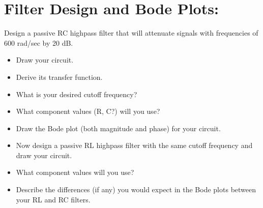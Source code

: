 \section{Filter Design and Bode Plots:}
Design a passive RC highpass filter that will attenuate signals with frequencies of 600 rad/sec by 20 dB.
\begin{itemize}
\item Draw your circuit.
\item Derive its transfer function.
\item What is your desired cutoff frequency?
\item What component values  (R, C?) will you use?
\item Draw the Bode plot (both magnitude and phase) for your circuit.
\item Now design a passive RL highpass filter with the same cutoff frequency
and draw your circuit.
\item What component values will you use?
\item Describe the differences (if any) you would expect in the Bode plots between your RL and RC filters.
\end{itemize}

